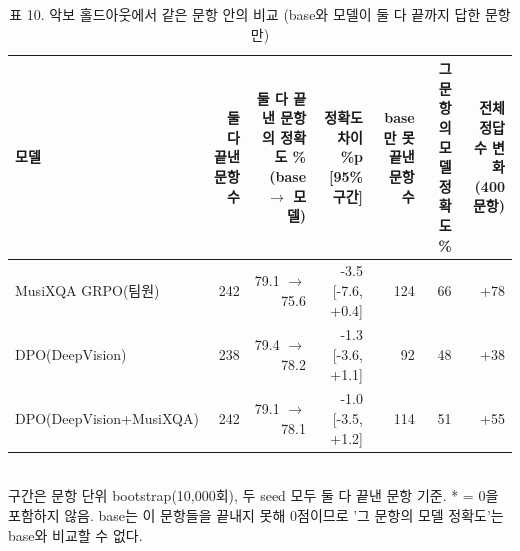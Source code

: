 \begin{table}[t]
\centering
\small
\caption{표 10. 악보 홀드아웃에서 같은 문항 안의 비교 (base와 모델이 둘 다 끝까지 답한 문항만)}
\label{tab:table10_holdout_same_questions}
\begin{tabular}{lrrrrrr}
\toprule
모델 & 둘 다 끝낸 문항 수 & 둘 다 끝낸 문항의 정확도 \% (base $\to$ 모델) & 정확도 차이 \%p [95\% 구간] & base만 못 끝낸 문항 수 & 그 문항의 모델 정확도 \% & 전체 정답 수 변화(400문항) \\
\midrule
MusiXQA GRPO(팀원) & 242 & 79.1 $\to$ 75.6 & -3.5 [-7.6, +0.4] & 124 & 66 & +78 \\
DPO(DeepVision) & 238 & 79.4 $\to$ 78.2 & -1.3 [-3.6, +1.1] & 92 & 48 & +38 \\
DPO(DeepVision+MusiXQA) & 242 & 79.1 $\to$ 78.1 & -1.0 [-3.5, +1.2] & 114 & 51 & +55 \\
\bottomrule
\end{tabular}
\\[2pt]{\footnotesize 구간은 문항 단위 bootstrap(10,000회), 두 seed 모두 둘 다 끝낸 문항 기준. * = 0을 포함하지 않음. base는 이 문항들을 끝내지 못해 0점이므로 '그 문항의 모델 정확도'는 base와 비교할 수 없다.}
\end{table}
